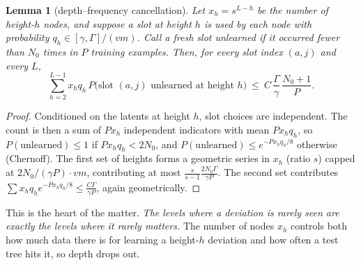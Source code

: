 \documentclass[11pt]{article}
\newtheorem{lemma}[theorem]{Lemma}
\theoremstyle{definition}
\begin{document}
\begin{lemma}[depth--frequency cancellation]\label{lem:cancel}
Let $x_h=s^{L-h}$ be the number of height-$h$ nodes, and suppose a slot at height $h$ is used by
each node with probability $q_h\in[\gamma,\Gamma]/(vm)$. Call a fresh slot \emph{unlearned}
if it occurred fewer than $N_0$ times in $P$ training examples. Then, for every slot index
$(a,j)$ and every $L$,
\[
\sum_{h=2}^{L-1}x_hq_h\,P\big(\text{slot $(a,j)$ unlearned at height }h\big)\ \le\ C\,\frac{\Gamma}{\gamma}\,\frac{N_0+1}{P}.
\]
\end{lemma}
\begin{proof}
Conditioned on the latents at height $h$, slot choices are independent. The count is then a sum
of $Px_h$ independent indicators with mean $Px_hq_h$, so $P(\text{unlearned})\le1$ if
$Px_hq_h<2N_0$, and $P(\text{unlearned})\le e^{-Px_hq_h/8}$ otherwise (Chernoff). The first set
of heights forms a geometric series in $x_h$ (ratio $s$) capped at $2N_0/(\gamma P)\cdot vm$,
contributing at most $\frac{s}{s-1}\frac{2N_0\Gamma}{\gamma P}$. The second set contributes
$\sum x_hq_he^{-Px_hq_h/8}\le\frac{C\Gamma}{\gamma P}$, again geometrically.
\end{proof}
\noindent This is the heart of the matter. \emph{The levels where a deviation is rarely seen are
exactly the levels where it rarely matters.} The number of nodes $x_h$ controls both how much
data there is for learning a height-$h$ deviation and how often a test tree hits it, so depth
drops out.
\end{document}
